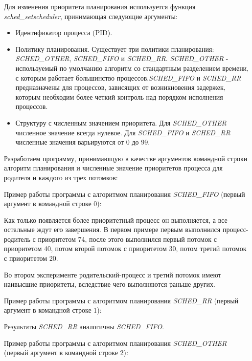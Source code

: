 \documentclass[14pt,a4paper,report]{report}
\begin{document}
Для изменения приоритета планирования используется функция \emph{sched\_setscheduler}, принимающая следующие аргументы:

\begin{itemize}
	\item Идентификатор процесса (PID).
	\item Политику планирования. Существует три политики планирования: \emph{SCHED\_OTHER}, \emph{SCHED\_FIFO} и \emph{SCHED\_RR}. \emph{SCHED\_OTHER} - используемый по умолчанию алгоритм со стандартным разделением времени, с которым работает большинство процессов.\emph{SCHED\_FIFO} и \emph{SCHED\_RR} предназначены для процессов, зависящих от возникновения задержек, которым необходим более четкий контроль над порядком исполнения процессов.
	\item Структуру с численным значением приоритета. Для \emph{SCHED\_OTHER} численное значение всегда нулевое. Для \emph{SCHED\_FIFO} и \emph{SCHED\_RR} численные значения варьируются от 0 до 99.
\end{itemize}

Разработаем программу, принимающую в качестве аргументов командной строки алгоритм планирования и численные значение приоритетов процесса для родителя и каждого из трех потомков:



Пример работы программы с алгоритмом планирования \emph{SCHED\_FIFO} (первый аргумент в командной строке 0):



Как только появляется более приоритетный процесс он выполняется, а все остальные ждут его завершения. В первом примере первым выполнился процесс-родитель с приоритетом 74, после этого выполнился первый потомок с приоритетом 40, потом второй потомок с приоритетом 30, потом третий потомок с приоритетом 20.

Во втором эксперименте родительский-процесс и третий потомок имеют наивысшие приоритеты, вследствие чего выполняются раньше других.

Пример работы программы с алгоритмом планирования \emph{SCHED\_RR} (первый аргумент в командной строке 1):



Результаты \emph{SCHED\_RR} аналогичны \emph{SCHED\_FIFO}.

Пример работы программы с алгоритмом планирования \emph{SCHED\_OTHER} (первый аргумент в командной строке 2):
\end{document}
